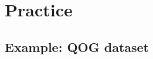 \documentclass[t]{beamer}
\begin{document}


	\section{Practice}

	\subsection{Example: QOG dataset}
	
\end{document}
